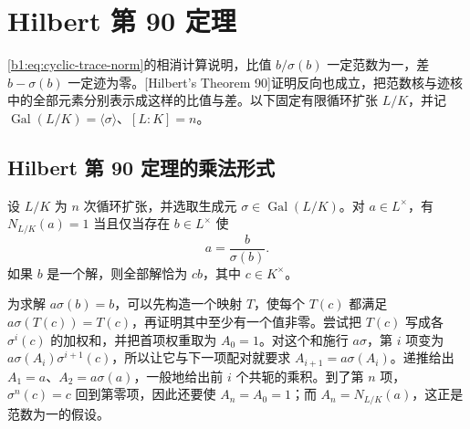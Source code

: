 
\section{Hilbert 第 90 定理}
\label{b1:sec:2002}

\eqref{b1:eq:cyclic-trace-norm}的相消计算说明，比值 \(b/\sigma(b)\) 一定范数为一，差 \(b-\sigma(b)\) 一定迹为零。[Hilbert's Theorem 90]证明反向也成立，把范数核与迹核中的全部元素分别表示成这样的比值与差。以下固定有限循环扩张 \(L/K\)，并记 \(\operatorname{Gal}(L/K)=\langle\sigma\rangle\)、\([L:K]=n\)。

%
%

\subsection{Hilbert 第 90 定理的乘法形式}
\label{b1:subsec:2002:01}

\begin{theorem}\label{b1:thm:hilbert90-multiplicative}
	设 \(L/K\) 为 \(n\) 次循环扩张，并选取生成元 \(\sigma\in\operatorname{Gal}(L/K)\)。对 \(a\in L^\times\)，有 \(N_{L/K}(a)=1\) 当且仅当存在 \(b\in L^\times\) 使
	\[
		a=\frac{b}{\sigma(b)}.
	\]
	如果 \(b\) 是一个解，则全部解恰为 \(cb\)，其中 \(c\in K^\times\)。
\end{theorem}

为求解 \(a\sigma(b)=b\)，可以先构造一个映射 \(T\)，使每个 \(T(c)\) 都满足 \(a\sigma(T(c))=T(c)\)，再证明其中至少有一个值非零。尝试把 \(T(c)\) 写成各 \(\sigma^i(c)\) 的加权和，并把首项权重取为 \(A_0=1\)。对这个和施行 \(a\sigma\)，第 \(i\) 项变为 \(a\sigma(A_i)\sigma^{i+1}(c)\)，所以让它与下一项配对就要求 \(A_{i+1}=a\sigma(A_i)\)。递推给出 \(A_1=a\)、\(A_2=a\sigma(a)\)，一般地给出前 \(i\) 个共轭的乘积。到了第 \(n\) 项，\(\sigma^n(c)=c\) 回到第零项，因此还要使 \(A_n=A_0=1\)；而 \(A_n=N_{L/K}(a)\)，这正是范数为一的假设。

